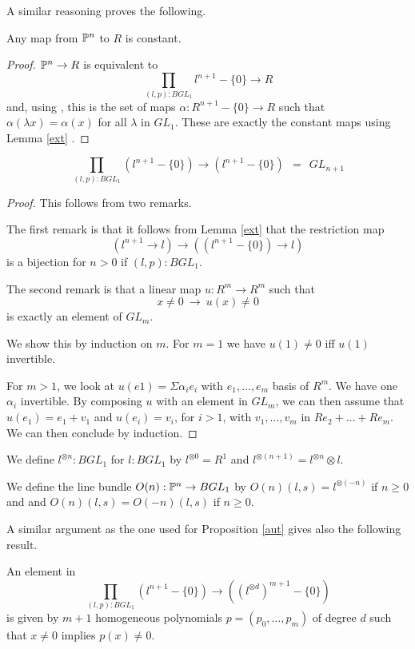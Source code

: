 A similar reasoning proves the following.

\begin{proposition}\label{const}
 Any map from $\mathbb{P}^n$ to $R$ is constant.
\end{proposition}

\begin{proof}
  $\mathbb{P}^n\rightarrow R$ is equivalent to
  $$\prod_{(l,p):BGL_1}l^{n+1}-\{0\}\rightarrow R$$
  and, using \cite{Sym}, this is the set of maps $\alpha:R^{n+1}-\{0\}\rightarrow R$
  such that $\alpha(\lambda x) = \alpha(x)$ for all $\lambda$ in $GL_1$. These are exactly the constant maps
  using Lemma \ref{ext} \cite{draft}.
\end{proof}

\begin{proposition}\label{aut}
$$\prod_{(l,p):BGL_1}(l^{n+1}-\{0\})\rightarrow (l^{n+1}-\{0\}) ~~=~~ GL_{n+1}$$
\end{proposition}

\begin{proof}
  This follows from two remarks.

  The first remark is that it follows from Lemma \ref{ext} that the restriction map
$$
(l^{n+1}\rightarrow l)\rightarrow ((l^{n+1}-\{0\})\rightarrow l)
$$
is a bijection for $n>0$ if $(l,p):BGL_1$.

\medskip

The second remark is that a linear map $u:R^{m}\rightarrow R^{m}$ such that
$$
x\neq 0~\rightarrow~u(x)\neq 0
$$
is exactly an element of $GL_{m}$.

We show this by induction on $m$. For $m=1$ we have $u(1)\neq 0$ iff $u(1)$ invertible.

For $m>1$, we look at $u(e1) = \Sigma \alpha_ie_i$ with $e_1,\dots,e_m$ basis of $R^m$.
We have one $\alpha_i$ invertible. By composing $u$ with an element in $GL_m$, we can then
assume that $u(e_1) = e_1+v_1$ and $u(e_i) = v_i$, for $i>1$, with $v_1,\dots,v_m$ in $Re_2+\dots+Re_m$.
We can then conclude by induction.
\end{proof}

We define $l^{\otimes n}:BGL_1$ for $l:BGL_1$ by $l^{\otimes 0} = R^1$ and $l^{\otimes (n+1)} = l^{\otimes n}\otimes l$.

We define the line bundle $O(n):\mathbb{P}^n\rightarrow BGL_1$ by $O(n)(l,s) = l^{\otimes (-n)}$ if $n\geq 0$ and 
and $O(n)(l,s) = O(-n)(l,s)$ if $n\geq 0$.

\medskip

 A similar argument as the one used for Proposition \ref{aut} gives also the following result.
 
 \begin{lemma}\label{hom}
   An element in
  $$\prod_{(l,p):BGL_1}(l^{n+1}-\{0\})\rightarrow ((l^{\otimes d})^{m+1}-\{0\})$$
  is given by $m+1$ homogeneous polynomials $p = (p_0,\dots,p_m)$ of degree $d$ such that
  $x\neq 0$ implies $p(x)\neq 0$.
\end{lemma}
